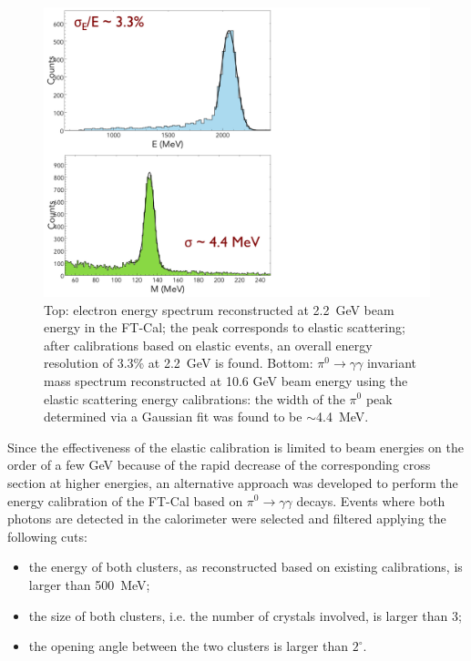 \begin{figure}[t]
\centering
\includegraphics[height=1.0\columnwidth]{fig/ftcal_elasticres.pdf}
\caption{Top: electron energy spectrum reconstructed at 2.2~GeV beam energy in the FT-Cal; the peak corresponds
  to elastic scattering; after calibrations based on elastic events, an overall energy resolution of 3.3\% at 2.2~GeV is
  found. Bottom: $\pi^0\to\gamma\gamma$ invariant mass spectrum reconstructed at 10.6 GeV beam energy using the
  elastic scattering energy calibrations: the width of the $\pi^0$ peak determined via a Gaussian fit was found to be
  $\sim$4.4~MeV.}
\label{fig:ftcal_elasticres}
\end{figure}

Since the effectiveness of the elastic calibration is limited to beam energies on the order of a few GeV because of
the rapid decrease of the corresponding cross section at higher energies, an alternative approach was developed to
perform the energy calibration of the FT-Cal based on $\pi^0\to\gamma\gamma$ decays. Events where both
photons are detected in the calorimeter were selected and filtered applying the following cuts:
\begin{itemize}
    \item the energy of both clusters, as reconstructed based on existing calibrations, is larger than 500~MeV;
    \item the size of both clusters, i.e. the number of crystals involved, is larger than 3;
    \item the opening angle between the two clusters is larger than $2^\circ$.
\end{itemize}

